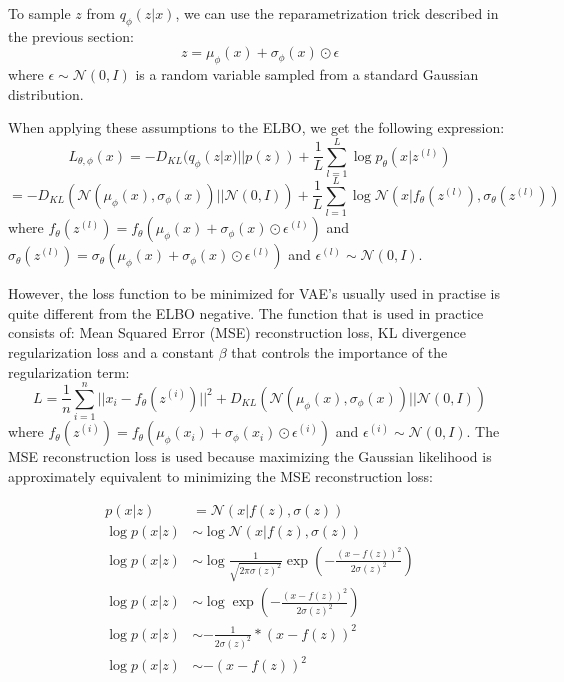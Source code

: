 To sample $z$ from $q_{\phi}(z|x)$, we can use the reparametrization trick described in the previous section: \[ z = \mu_{\phi}(x) + \sigma_{\phi}(x) \odot \epsilon \] where $\epsilon \sim \mathcal{N}(0, I)$ is a random variable sampled from a standard Gaussian distribution.

When applying these assumptions to the ELBO, we get the following expression: \[ L_{\theta, \phi}(x) = - D_{KL}(q_{\phi}(z|x) || p(z)) + \frac{1}{L} \sum_{l=1}^{L} \log p_{\theta}(x|z^{(l)}) \]
\[ = - D_{KL}(\mathcal{N}(\mu_{\phi}(x), \sigma_{\phi}(x)) || \mathcal{N}(0, I)) + \frac{1}{L} \sum_{l=1}^{L} \log \mathcal{N}(x|f_{\theta}(z^{(l)}), \sigma_{\theta}(z^{(l)})) \]
where $f_{\theta}(z^{(l)}) = f_{\theta}(\mu_{\phi}(x) + \sigma_{\phi}(x) \odot \epsilon^{(l)})$ and $\sigma_{\theta}(z^{(l)}) = \sigma_{\theta}(\mu_{\phi}(x) + \sigma_{\phi}(x) \odot \epsilon^{(l)})$ and $\epsilon^{(l)} \sim \mathcal{N}(0, I)$.

However, the loss function to be minimized for VAE's usually used in practise is quite different from the ELBO negative. The function that is used in practice consists of: Mean Squared Error (MSE) reconstruction loss, KL divergence regularization loss and a constant $\beta$ that controls the importance of the regularization term:
\[ L = \frac{1}{n} \sum_{i=1}^{n} ||x_i - f_{\theta}(z^{(i)}) ||^2 + D_{KL}(\mathcal{N}(\mu_{\phi}(x), \sigma_{\phi}(x)) || \mathcal{N}(0, I)) \]
where $f_{\theta}(z^{(i)}) = f_{\theta}(\mu_{\phi}(x_i) + \sigma_{\phi}(x_i) \odot \epsilon^{(i)})$ and $\epsilon^{(i)} \sim \mathcal{N}(0, I)$. The MSE reconstruction loss is used because maximizing the Gaussian likelihood is approximately equivalent to minimizing the MSE reconstruction loss:

\begin{equation} \label{eqMSE}
    \begin{split}
        p(x|z) &= \mathcal{N}(x|f(z), \sigma(z)) \\
        \log p(x|z) &\sim  \log \mathcal{N}(x|f(z), \sigma(z)) \\
        \log p(x|z) &\sim  \log \frac{1}{\sqrt{2 \pi \sigma(z)^2}} \exp(-\frac{(x - f(z))^2}{2 \sigma(z)^2}) \\
        \log p(x|z) &\sim  \log \exp(-\frac{(x - f(z))^2}{2 \sigma(z)^2}) \\
        \log p(x|z) &\sim  - \frac{1}{2 \sigma(z)^2} * (x - f(z))^2 \\
        \log p(x|z) &\sim  -  (x - f(z))^2 \\
    \end{split}
\end{equation}

